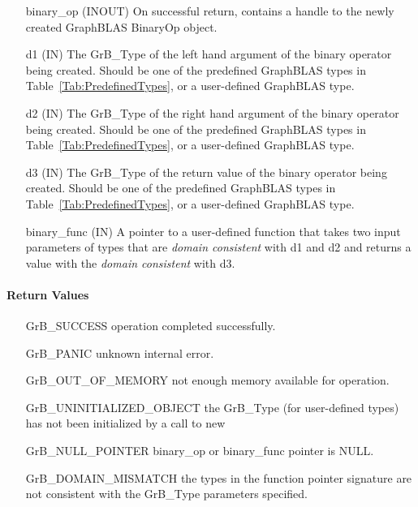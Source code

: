 \begin{itemize}[leftmargin=1.1in]
    \item[{\sf binary\_op}] ({\sf INOUT}) On successful return, contains a 
          handle to the newly created GraphBLAS BinaryOp object.
    \item[{\sf d1}]  ({\sf IN}) The {\sf GrB\_Type} of the left hand 
          argument of the binary operator being created. Should be one of the
          predefined GraphBLAS types in Table~\ref{Tab:PredefinedTypes}, or a
          user-defined GraphBLAS type.
    \item[{\sf d2}]  ({\sf IN}) The {\sf GrB\_Type} of the right hand 
          argument of the binary operator being created. Should be one of the
          predefined GraphBLAS types in Table~\ref{Tab:PredefinedTypes}, or a 
          user-defined GraphBLAS type.
    \item[{\sf d3}]  ({\sf IN}) The {\sf GrB\_Type} of the return
          value of the binary operator being created. Should be one of the
          predefined GraphBLAS types in Table~\ref{Tab:PredefinedTypes}, or a 
          user-defined GraphBLAS type.
    \item[{\sf binary\_func}] ({\sf IN}) A pointer to a user-defined function that 
          takes two input parameters of types that are \emph{domain consistent} with {\sf d1} and {\sf d2} and returns a value with the \emph{domain consistent} with {\sf d3}.
\end{itemize}

\paragraph{Return Values}

\begin{itemize}[leftmargin=2.1in]
\item[{\sf GrB\_SUCCESS}]           operation completed successfully.
\item[{\sf GrB\_PANIC}]             unknown internal error.
\item[{\sf GrB\_OUT\_OF\_MEMORY}]          not enough memory available for operation.
\item[{\sf GrB\_UNINITIALIZED\_OBJECT}]          the {\sf GrB\_Type} (for user-defined types)
                                    has not been initialized by a call to {\sf new}
\item[{\sf GrB\_NULL\_POINTER}]    {\sf binary\_op} or {\sf binary\_func} pointer is {\sf NULL}.
\item[{\sf GrB\_DOMAIN\_MISMATCH}]  the types in the function pointer signature are not   
                                    consistent with the {\sf GrB\_Type} parameters specified.
\end{itemize}

